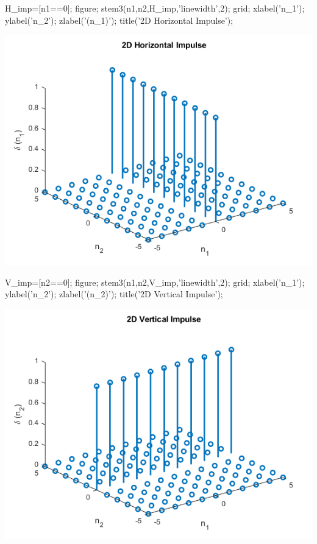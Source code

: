 \documentclass[12pt, onecolumn]{IEEEtran}
\begin{document}
\begin{matlabcode}
H_imp=[n1==0]; figure; stem3(n1,n2,H_imp,'linewidth',2); grid; %
xlabel('n_1'); ylabel('n_2'); zlabel('\delta (n_1)'); title('2D Horizontal Impulse');
\end{matlabcode}
\begin{center}
\includegraphics[width=\maxwidth{56.196688409433015em}]{figure_1.png}
\end{center}
\begin{matlabcode}
V_imp=[n2==0]; figure; stem3(n1,n2,V_imp,'linewidth',2); grid; %
xlabel('n_1'); ylabel('n_2'); zlabel('\delta (n_2)'); title('2D Vertical Impulse');
\end{matlabcode}
\begin{center}
\includegraphics[width=\maxwidth{56.196688409433015em}]{figure_2.png}
\end{center}
\end{document}

